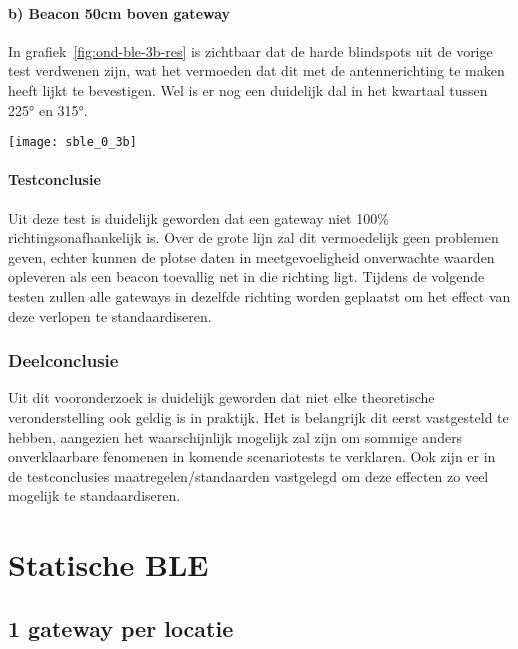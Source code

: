 \paragraph{b) Beacon 50cm boven gateway}
\begin{minipage}{0.55\textwidth}
In grafiek~\ref{fig:ond-ble-3b-res} is zichtbaar dat de harde blindspots uit de vorige test verdwenen zijn, wat het vermoeden dat dit met de antennerichting te maken heeft lijkt te bevestigen. Wel is er nog een duidelijk dal in het kwartaal tussen 225° en 315°.
\end{minipage}
\hfill
\begin{minipage}{0.42\textwidth}
	\texttt{[image: sble\_0\_3b]}
	\label{fig:ond-ble-3b-res}
\end{minipage}

\paragraph{Testconclusie}
Uit deze test is duidelijk geworden dat een gateway niet 100\% richtingsonafhankelijk is. Over de grote lijn zal dit vermoedelijk geen problemen geven, echter kunnen de plotse daten in meetgevoeligheid onverwachte waarden opleveren als een beacon toevallig net in die richting ligt.
Tijdens de volgende testen zullen alle gateways in dezelfde richting worden geplaatst om het effect van deze verlopen te standaardiseren. 

\subsubsection{Deelconclusie}
Uit dit vooronderzoek is duidelijk geworden dat niet elke theoretische veronderstelling ook geldig is in praktijk. Het is belangrijk dit eerst vastgesteld te hebben, aangezien het waarschijnlijk mogelijk zal zijn om sommige anders onverklaarbare fenomenen in komende scenariotests te verklaren. Ook zijn er in de testconclusies maatregelen/standaarden vastgelegd om deze effecten zo veel mogelijk te standaardiseren.

\section{Statische BLE}
\subsection{1 gateway per locatie}
\label{sec:ond-ble-1}


